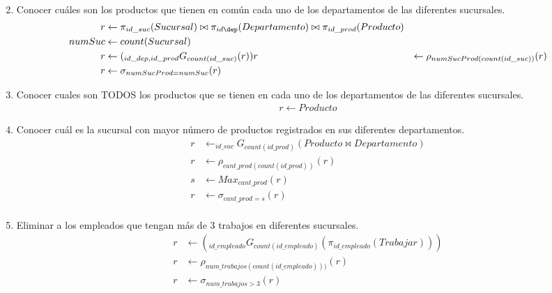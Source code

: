 \documentclass{article}
\begin{document}
\begin{enumerate}
{\begin{align*}
            \end{align*}
        }
        \item {
            Conocer cuáles son los productos que tienen en común cada uno de los
            departamentos de las diferentes sucursales.      
            \begin{align*}
                r &\leftarrow \pi_{id\_suc}(Sucursal) \bowtie \pi_{id\dep}
                (Departamento) \bowtie \pi_{id\_prod}(Producto) \\
                numSuc &\leftarrow count(Sucursal) \\
                r &\leftarrow (_{id\_dep, id\_prod}G_{count(id\_suc)}(r))
                r &\leftarrow \rho_{numSucProd(count(id\_suc))}(r) \\
                r &\leftarrow \sigma_{numSucProd = numSuc}(r)
            \end{align*}
        }
        \item {
            Conocer cuales son TODOS los productos que se tienen en cada uno de
            los departamentos de las diferentes sucursales.
            \begin{align*}
                r \leftarrow Producto
            \end{align*}
        }
        \item {
            Conocer cuál es la sucursal con mayor número de productos
            registrados en sus diferentes departamentos.
            \begin{align*}
            r &\leftarrow _{id\_suc}G_{count(id\_prod)}(Producto \bowtie Departamento)\\
            r &\leftarrow \rho_{cant\_prod(count(id\_prod))}(r)\\
            s &\leftarrow Max_{cant\_prod}(r)\\
            r &\leftarrow \sigma_{cant\_prod=s}(r)\\
            \end{align*}
        }
        \item {
            Eliminar a los empleados que tengan más de 3 trabajos en diferentes 
            sucursales.
            \begin{align*}
                r &\leftarrow (_{id\_empleado}G_{count(id\_empleado)}
                (\pi_{id\_empleado}(Trabajar))) \\
                r &\leftarrow \rho_{num\_trabajos(count(id\_empleado)))}(r)\\
                r &\leftarrow \sigma_{num\_trabajos>3}(r)\\

\end{align*}}
\end{enumerate}
\end{document}
